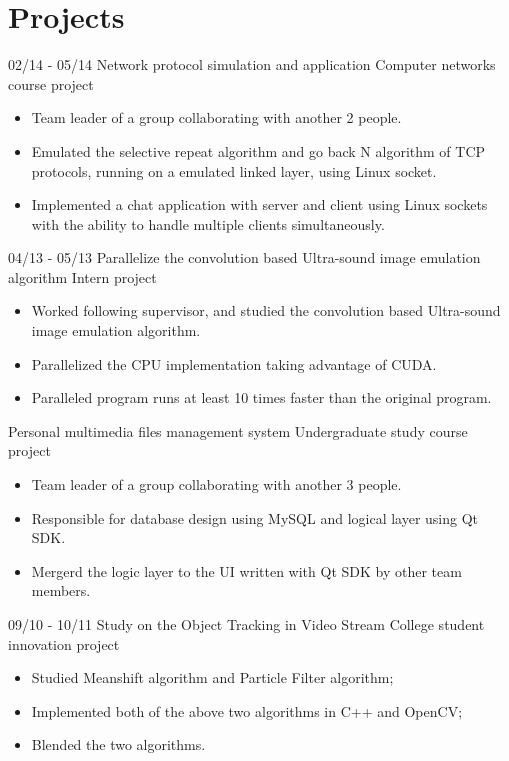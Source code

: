 \documentclass[]{friggeri-cv}
\begin{document}
\section{Projects}
\begin{entrylist}
	\entry
	{02/14 - 05/14}
	{Network protocol simulation and application}
	{Computer networks course project}
	{
		\vspace{-3mm}
		\begin{itemize}
			\item Team leader of a group collaborating with another 2 people.
			\item Emulated the selective repeat algorithm and go back N algorithm of TCP protocols, running on a emulated linked layer, using Linux socket.
			\item Implemented a chat application with server and client using Linux sockets with the ability to handle multiple clients simultaneously.
		\end{itemize}
	}
	\entry
	{04/13 - 05/13}
	{Parallelize the convolution based Ultra-sound image emulation algorithm}
	{Intern project}
	{
		\vspace{-3mm}
		\begin{itemize}
			\item Worked following supervisor, and studied the convolution based Ultra-sound image emulation algorithm.
			\item Parallelized the CPU implementation taking advantage of CUDA.
			\item Paralleled program runs at least 10 times faster than the original program.
		\end{itemize}
	}
	\entry
	{}
	{Personal multimedia files management system}
	{Undergraduate study course project}
	{
		\vspace{-3mm}
		\begin{itemize}
			\item Team leader of a group collaborating with another 3 people.
			\item Responsible for database design using MySQL and logical layer using Qt SDK.
			\item Mergerd the logic layer to the UI written with Qt SDK by other team members.
	    \end{itemize}
	}
	\entry
	{09/10 - 10/11}
	{Study on the Object Tracking in Video Stream}
	{College student innovation project}
	{
		\vspace{-3mm}
		\begin{itemize}
			\item Studied Meanshift algorithm and Particle Filter algorithm;
			\item Implemented both of the above two algorithms in C++ and OpenCV;
			\item Blended the two algorithms.
		\end{itemize}
	}
\end{entrylist}
\end{document}
